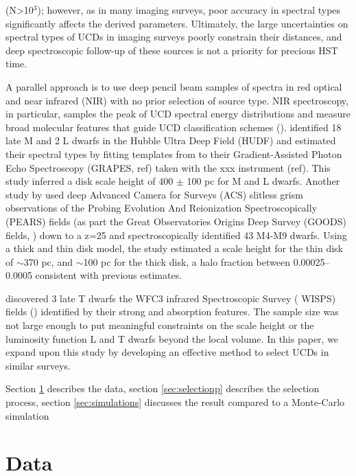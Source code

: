 \documentclass[manuscript]{aastex63}
\begin{document}
(N\textgreater 10$^3$); however, as in many imaging surveys, poor accuracy in spectral types significantly affects the derived parameters. Ultimately, the large uncertainties on spectral types  of UCDs in imaging surveys poorly constrain their distances, and deep spectroscopic follow-up of these sources is not a priority for precious HST time. 


A parallel approach is to use deep pencil beam samples of spectra in red optical and near infrared (NIR) with no prior selection of source type. NIR spectroscopy, in particular, samples the peak of UCD spectral energy distributions and measure broad molecular features that guide UCD classification schemes (\citealt{2005ARA&A..43..195K}). \citet{2005ApJ...622..319P} identified 18 late M and 2 L dwarfs in the Hubble Ultra Deep Field (HUDF) and estimated their spectral types by fitting templates from \citet{Kirkpatrick2000} to their Gradient-Assisted Photon Echo Spectroscopy (GRAPES, ref) taken with the xxx instrument (ref). This study inferred a disk scale height of 400 $\pm$ 100 pc for M and L dwarfs. Another study by \citet{2009ApJ...695.1591P} used deep Advanced Camera for Surveys (ACS) slitless grism observations of the Probing Evolution And Reionization Spectroscopically (PEARS) fields (as part the Great Observatories Origins Deep Survey (GOODS) fields, \citealt{Giavalisco2004}) down to a z=25 and spectroscopically identified 43 M4-M9 dwarfs. Using a thick and thin disk model, the study estimated a scale height for the thin disk of $\sim$370 pc, and $\sim$100 pc for the thick disk, a halo fraction between 0.00025--0.0005 consistent with previous estimates. 

\citealt{2012ApJ...752L..14M} discovered 3 late T dwarfs the WFC3 infrared Spectroscopic Survey ( WISPS) fields (\citealt{2010ApJ...723..104A}) identified by their strong \meth and \wat absorption features. The sample size was not large enough to put meaningful constraints on the scale height or the luminosity function L and T dwarfs beyond the local volume. In this paper, we expand upon this study by developing an effective method to select UCDs in similar surveys.


Section \ref{sec:data} describes the data, section \ref{sec:selectionp} describes the selection process, section \ref{sec:simulations} discusses the result compared to a Monte-Carlo simulation

\section{Data}\label{sec:data}
\end{document}
